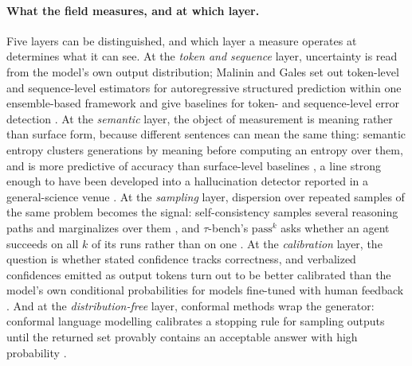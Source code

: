 \paragraph{What the field measures, and at which layer.}
Five layers can be distinguished, and which layer a measure operates at determines what it can
see. At the \emph{token and sequence} layer, uncertainty is read from the model's own output
distribution; Malinin and Gales set out token-level and sequence-level estimators for
autoregressive structured prediction within one ensemble-based framework and give baselines for
token- and sequence-level error detection \cite{malinin2021uncertainty}. At the \emph{semantic}
layer, the object of measurement is meaning rather than surface form, because different
sentences can mean the same thing: semantic entropy clusters generations by meaning before
computing an entropy over them, and is more predictive of accuracy than surface-level
baselines \cite{kuhn2023semanticuncertainty}, a line strong enough to have been developed into
a hallucination detector reported in a general-science venue
\cite{farquhar2024semanticentropy}. At the \emph{sampling} layer, dispersion over repeated
samples of the same problem becomes the signal: self-consistency samples several reasoning
paths and marginalizes over them \cite{wang2023selfconsistency}, and $\tau$-bench's
$\mathrm{pass}^k$ asks whether an agent succeeds on all $k$ of its runs rather than on one
\cite{yao2025taubench}. At the \emph{calibration} layer, the question is whether stated
confidence tracks correctness, and verbalized confidences emitted as output tokens turn out to
be better calibrated than the model's own conditional probabilities for models fine-tuned with
human feedback \cite{tian2023calibration}. And at the \emph{distribution-free} layer, conformal
methods wrap the generator: conformal language modelling calibrates a stopping rule for
sampling outputs until the returned set provably contains an acceptable answer with high
probability \cite{quach2024conformal}.

